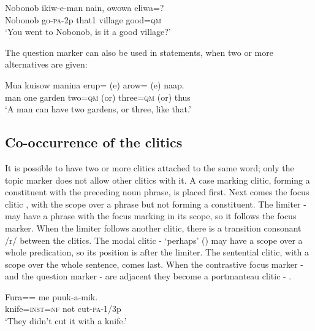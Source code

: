 \ea%
\label{ex:3:x790}
\gll Nobonob ikiw-e-man nain, owowa eliwa=? \\
Nobonob go-\textsc{pa}-2p that1 village good=\textsc{qm}\\
\glt`You went to Nobonob, is it a good village?'
\z

The question marker can also be used in statements, when two or more alternatives are given:

\ea%
\label{ex:3:x791}
\gll Mua kuisow manina erup= (e) arow= (e) naap. \\
man one garden two=\textsc{qm} (or) three=\textsc{qm} (or) thus\\
\glt`A man can have two gardens, or three, like that.'
\z

\subsection{Co-occurrence of the clitics}\label{sec:3.12.9}
{}
It is possible to have two or more clitics attached to the same word; only the topic marker does not allow other clitics with it. A case marking clitic, forming a constituent with the preceding noun phrase, is placed first. Next comes the focus clitic , with the scope over a phrase but not forming a constituent. The limiter \nobreakdash- may have a phrase with the focus marking in its scope, so it follows the focus marker. When the limiter follows another clitic, there is a transition consonant /r/ between the clitics. The modal clitic \nobreakdash- `perhaps' () may have a scope over a whole predication, so its position is after the limiter. The sentential clitic, with a scope over the whole sentence, comes last. When the contrastive focus marker - and the question marker - are adjacent they become a portmanteau clitic - .

\ea%
\label{ex:3:x792}
\gll Fura== me puuk-a-mik. \\
knife=\textsc{inst}=\textsc{nf} not cut-\textsc{pa}-1/3p\\
\glt`They didn't cut it with a knife.'
\z


